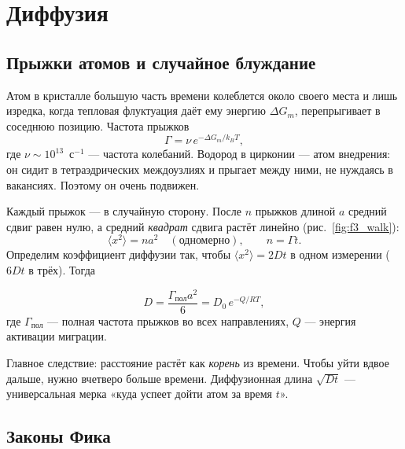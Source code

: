 \chapter{Диффузия}\label{ch:diffusion}

\section{Прыжки атомов и случайное блуждание}

Атом в кристалле большую часть времени колеблется около своего места и лишь изредка, когда тепловая флуктуация
даёт ему энергию $\Delta G_m$, перепрыгивает в соседнюю позицию. Частота прыжков
\begin{equation}
\Gamma = \nu\, e^{-\Delta G_m/k_BT},
\end{equation}
где $\nu\sim10^{13}$~с$^{-1}$ --- частота колебаний. Водород в цирконии --- атом внедрения: он сидит в
тетраэдрических междоузлиях и прыгает между ними, не нуждаясь в вакансиях. Поэтому он очень подвижен.

Каждый прыжок --- в случайную сторону. После $n$ прыжков длиной $a$ средний сдвиг равен нулю, а средний
\emph{квадрат} сдвига растёт линейно (рис.~\ref{fig:f3_walk}):
\begin{equation}
\langle x^2\rangle = n a^2 \quad(\text{одномерно}),\qquad n = \Gamma t .
\end{equation}
Определим коэффициент диффузии так, чтобы $\langle x^2\rangle = 2Dt$ в одном измерении ($6Dt$ в трёх). Тогда
\begin{keyf}
\[
D = \frac{\Gamma_{\text{пол}} a^2}{6} = D_0\,e^{-Q/RT},
\]
где $\Gamma_{\text{пол}}$ --- полная частота прыжков во всех направлениях, $Q$ --- энергия активации миграции.
\end{keyf}


\begin{idea}
Главное следствие: расстояние растёт как \emph{корень} из времени. Чтобы уйти вдвое дальше, нужно вчетверо
больше времени. Диффузионная длина $\sqrt{Dt}$ --- универсальная мерка «куда успеет дойти атом за время $t$».
\end{idea}

\section{Законы Фика}

